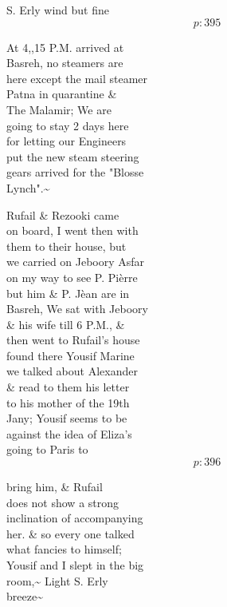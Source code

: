 \documentclass{report}
\begin{document}
	\par{
 	S. Erly wind but fine\ \\
  \[p: 395 \]

	}



	\par{
 	At 4,,15 P.M. arrived at\ \\Basreh, no steamers are\ \\here except the mail steamer\ \\Patna in quarantine \&\ \\The Malamir; We are\ \\going to stay 2 days here\ \\for letting our Engineers\ \\put the new steam steering\ \\gears arrived for the "Blosse\ \\Lynch".\~{}\ \\
	}

	\par{
 	Rufail \& Rezooki came\ \\on board, I went then with\ \\them to their house, but\ \\we carried on Jeboory Asfar\ \\on my way to see P. Pièrre\ \\but him \& P. Jèan are in\ \\Basreh, We sat with Jeboory\ \\\& his wife till 6 P.M., \&\ \\then went to Rufail's house\ \\found there Yousif Marine\ \\we talked about Alexander\ \\\& read to them his letter\ \\to his mother of the 19th\ \\Jany; Yousif seems to be\ \\against the idea of Eliza's\ \\going to Paris to\ \\
  \[p: 396 \]

	}



	\par{
 	bring him, \& Rufail\ \\does not show a strong\ \\inclination of accompanying\ \\her. \& so every one talked\ \\what fancies to himself;\ \\Yousif and I slept in the big\ \\room,\~{} Light S. Erly\ \\breeze\~{}\ \\
	}
\end{document}
